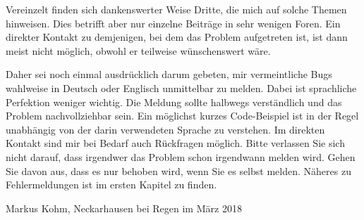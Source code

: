 Vereinzelt finden sich dankenswerter Weise Dritte, die mich auf solche Themen
hinweisen. Dies betrifft aber nur einzelne Beiträge in sehr wenigen Foren. Ein
direkter Kontakt zu demjenigen, bei dem das Problem aufgetreten ist, ist dann
meist nicht möglich, obwohl er teilweise wünschenswert wäre.

Daher sei noch einmal ausdrücklich darum gebeten, mir vermeintliche Bugs
wahlweise in Deutsch oder Englisch unmittelbar zu melden. Dabei ist
sprachliche Perfektion weniger wichtig. Die Meldung sollte halbwegs
verständlich und das Problem nachvollziehbar sein. Ein möglichst kurzes
Code-Beispiel ist in der Regel unabhängig von der darin verwendeten Sprache zu
verstehen. Im direkten Kontakt sind mir bei Bedarf auch Rückfragen
möglich. Bitte verlassen Sie sich nicht darauf, dass irgendwer das Problem
schon irgendwann melden wird. Gehen Sie davon aus, dass es nur behoben wird,
wenn Sie es selbst melden. Näheres zu Fehlermeldungen ist im ersten Kapitel
 zu finden.

\bigskip\noindent
Markus Kohm, Neckarhausen bei Regen im März 2018
\endinput


